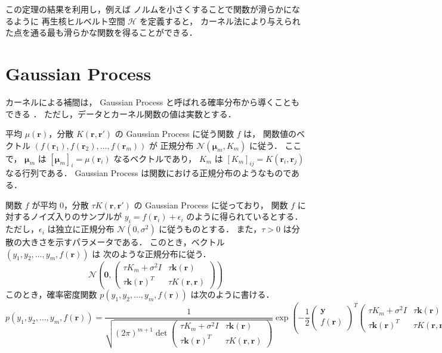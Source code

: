 この定理の結果を利用し，例えば
ノルムを小さくすることで関数が滑らかになるように
再生核ヒルベルト空間 $\mathcal{H}$ を定義すると，
カーネル法により与えられた点を通る最も滑らかな関数を得ることができる．

\section{Gaussian Process}\label{sec:regularization_kernel_gaussian-process}

カーネルによる補間は，
Gaussian Process と呼ばれる確率分布から導くこともできる
\cite{Brochu2010}．
ただし，データとカーネル関数の値は実数とする．

平均 $\mu(\bm{r})$，分散 $K(\bm{r}, \bm{r}')$ の Gaussian Process に従う関数 $f$ は，
関数値のベクトル $(f(\bm{r}_1), f(\bm{r}_2), \ldots, f(\bm{r}_m))$ が
正規分布 $\mathcal{N}(\bm{\mu}_m, K_m)$ に従う．
ここで，
$\bm{\mu}_m$ は $[\bm{\mu}_m]_i = \mu(\bm{r}_i)$ なるベクトルであり，
$K_m$ は $[K_m]_{ij} = K(\bm{r}_i, \bm{r}_j)$ なる行列である．
Gaussian Process は関数における正規分布のようなものである．

関数 $f$ が平均 $0$，分散 $\tau K(\bm{r}, \bm{r}')$ の Gaussian Process に従っており，
関数 $f$ に対するノイズ入りのサンプルが $y_i = f(\bm{r}_i) + \epsilon_i$ のように得られているとする．
ただし，$\epsilon_i$ は独立に正規分布 $\mathcal{N}(0, \sigma^2)$ に従うものとする．
また，$\tau > 0$ は分散の大きさを示すパラメータである．
このとき，ベクトル $(y_1, y_2, \ldots, y_m, f(\bm{r}))$ は
次のような正規分布に従う．
\begin{equation}
    \mathcal{N}\left(\bm{0},
    \begin{pmatrix}
        \tau K_m + \sigma^2 I & \tau \bm{k}(\bm{r})    \\
        \tau \bm{k}(\bm{r})^T & \tau K(\bm{r}, \bm{r})
    \end{pmatrix}
    \right)
\end{equation}
このとき，確率密度関数 $p(y_1, y_2, \ldots, y_m, f(\bm{r}))$ は次のように書ける．
\begin{equation}
    p(y_1, y_2, \ldots, y_m, f(\bm{r}))
    = \frac{1}{\sqrt{(2\pi)^{m+1} \det{
                \begin{pmatrix}
                    \tau K_m + \sigma^2 I & \tau \bm{k}(\bm{r})    \\
                    \tau \bm{k}(\bm{r})^T & \tau K(\bm{r}, \bm{r})
                \end{pmatrix}
            }}}
    \exp\left(-\frac{1}{2}
    \begin{pmatrix}
        \bm{y} \\ f(\bm{r})
    \end{pmatrix}^T
    \begin{pmatrix}
        \tau K_m + \sigma^2 I & \tau \bm{k}(\bm{r})    \\
        \tau \bm{k}(\bm{r})^T & \tau K(\bm{r}, \bm{r})
    \end{pmatrix}^{-1}
    \begin{pmatrix}
        \bm{y} \\ f(\bm{r})
    \end{pmatrix}
    \right)
\end{equation}

